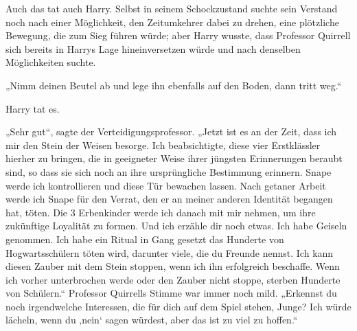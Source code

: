 Auch das tat auch Harry.
Selbst in seinem Schockzustand suchte sein Verstand noch nach einer Möglichkeit, den Zeitumkehrer dabei zu drehen, eine plötzliche Bewegung, die zum Sieg führen würde; aber Harry wusste, dass Professor Quirrell sich bereits in Harrys Lage hineinversetzen würde und nach denselben Möglichkeiten suchte.

„Nimm deinen Beutel ab und lege ihn ebenfalls auf den Boden, dann tritt weg.“

Harry tat es.

„Sehr gut“, sagte der Verteidigungsprofessor. „Jetzt ist es an der Zeit, dass ich mir den Stein der Weisen besorge. Ich beabsichtigte, diese vier Erstklässler hierher zu bringen, die in geeigneter Weise ihrer jüngsten Erinnerungen beraubt sind, so dass sie sich noch an ihre ursprüngliche Bestimmung erinnern. Snape werde ich kontrollieren und diese Tür bewachen lassen. Nach getaner Arbeit werde ich Snape für den Verrat, den er an meiner anderen Identität begangen hat, töten. Die 3 Erbenkinder werde ich danach mit mir nehmen, um ihre zukünftige Loyalität zu formen. Und ich erzähle dir noch etwas. Ich habe Geiseln genommen. Ich habe ein Ritual in Gang gesetzt das Hunderte von Hogwartsschülern töten wird, darunter viele, die du Freunde nennst. Ich kann diesen Zauber mit dem Stein stoppen, wenn ich ihn erfolgreich beschaffe. Wenn ich vorher unterbrochen werde oder den Zauber nicht stoppe, sterben Hunderte von Schülern.“
Professor Quirrells Stimme war immer noch mild.
„Erkennst du noch irgendwelche Interessen, die für dich auf dem Spiel stehen, Junge? Ich würde lächeln, wenn du ‚nein‘ sagen würdest, aber das ist zu viel zu hoffen.“

